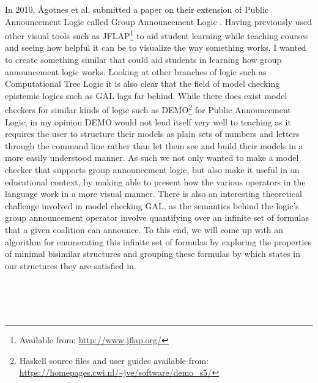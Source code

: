 In 2010, Ågotnes et al. submitted a paper on their extension of Public Announcement Logic called Group Announcement Logic \cite{Agotnes2010}. Having previously used other visual tools such as JFLAP\footnote{Available from: \url{http://www.jflap.org/}} to aid student learning while teaching courses and seeing how helpful it can be to visualize the way something works, I wanted to create something similar that could aid students in learning how group announcement logic works. Looking at other branches of logic such as Computational Tree Logic it is also clear that the field of model checking epistemic logics such as GAL lags far behind. While there does exist model checkers for similar kinds of logic such as DEMO\footnote{Haskell source files and user guides available from: \url{https://homepages.cwi.nl/~jve/software/demo_s5/}} for Public Announcement Logic, in my opinion DEMO would not lend itself very well to teaching as it requires the user to structure their models as plain sets of numbers and letters through the command line rather than let them see and build their models in a more easily understood manner. As such we not only wanted to make a model checker that supports group announcement logic, but also make it useful in an educational context, by making able to present how the various operators in the language work in a more visual manner. There is also an interesting theoretical challenge involved in model checking GAL, as the semantics behind the logic's group announcement operator involve quantifying over an infinite set of formulas that a given coalition can announce. To this end, we will come up with an algorithm for enumerating this infinite set of formulas by exploring the properties of minimal bisimilar structures and grouping these formulas by which states in our structures they are satisfied in. 



\\
\\
\\
